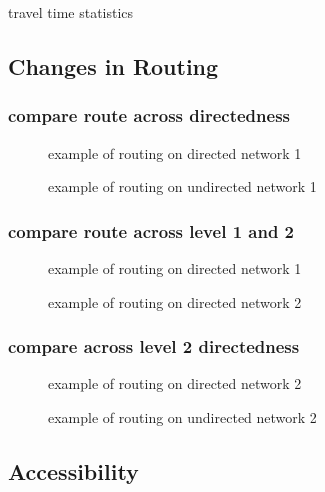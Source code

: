\begin{table}
\centering
\caption{travel time statistics}
\label{table:travel_time_stats}
\end{table}

\subsection{Changes in Routing}


\subsubsection{compare route across directedness}
\begin{figure}
\centering
\caption{example of routing on directed network 1}
\label{fig:routing_1}
\end{figure}

\begin{figure}
\centering
\caption{example of routing on undirected network 1}
\label{fig:routing_1}
\end{figure}

\subsubsection{compare route across level 1 and 2}

\begin{figure}
\centering
\caption{example of routing on directed network 1}
\label{fig:routing_1}
\end{figure}

\begin{figure}
\centering
\caption{example of routing on directed network 2}
\label{fig:routing_1}
\end{figure}

\subsubsection{compare across level 2 directedness}

\begin{figure}
\centering
\caption{example of routing on directed network 2}
\label{fig:routing_1}
\end{figure}

\begin{figure}
\centering
\caption{example of routing on undirected network 2}
\label{fig:routing_1}
\end{figure}


\subsection{Accessibility}

